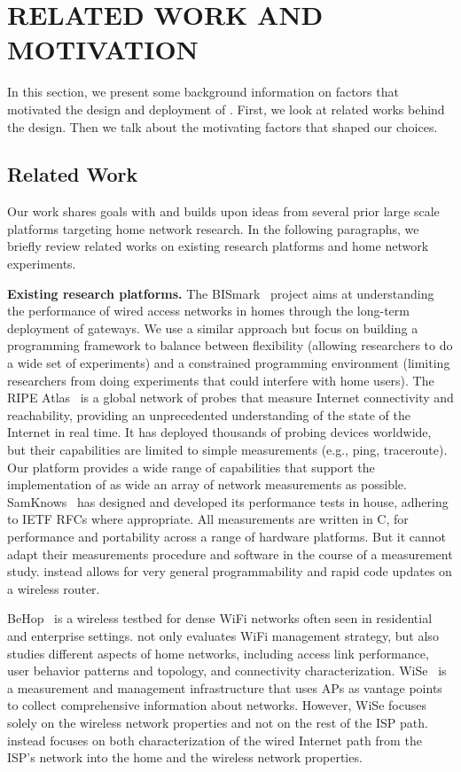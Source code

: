 \chapter{RELATED WORK AND MOTIVATION}
\label{sec.relatedwork_motivation}
In this section, we present some background information on factors that motivated the design and deployment of \sysname. First, we look at related works behind the design. Then we talk about the motivating factors that shaped our choices.
\section{Related Work}
\label{ssec.related_work}
Our work shares goals with and builds upon ideas from several prior large scale platforms targeting home network research. In the following paragraphs, we briefly review related works on existing research platforms and home network experiments.  

\textbf{Existing research platforms. }The BISmark~\cite{183951} project aims at understanding the performance of wired access networks in homes through the long-term deployment of gateways. We use a similar approach but focus on building a programming framework to balance between flexibility (allowing researchers to do a wide set of experiments) and a constrained programming environment (limiting researchers from doing experiments that could interfere with home users). The RIPE Atlas~\cite{ripeatlas} is a global network of probes that measure Internet connectivity and reachability, providing an unprecedented understanding of the state of the Internet in real time. It has deployed thousands of probing devices worldwide, but their capabilities are limited to simple measurements (e.g., ping, traceroute). Our platform provides a wide range of capabilities that support the implementation of as wide an array of network measurements as possible. SamKnows~\cite{samknows} has designed and developed its performance tests in house, adhering to IETF RFCs where appropriate. All measurements are written in C, for performance and portability across a range of hardware platforms. But it cannot adapt their measurements procedure and software in the course of a measurement study. \sysname instead allows for very general programmability and rapid code updates on a wireless router. 

BeHop~\cite{yiakoumis2014behop} is a wireless testbed for dense WiFi networks often seen in residential and enterprise settings. \sysname not only evaluates WiFi management strategy, but also studies different aspects of home networks, including access link performance, user behavior patterns and topology, and connectivity characterization. WiSe~\cite{patro2013observing} is a measurement and management infrastructure that uses APs as vantage points to collect comprehensive information about networks. However, WiSe focuses solely on the wireless network properties and not on the rest of the ISP path. \sysname instead focuses on both characterization of the wired Internet path from the ISP’s network into the home and the wireless network properties.

